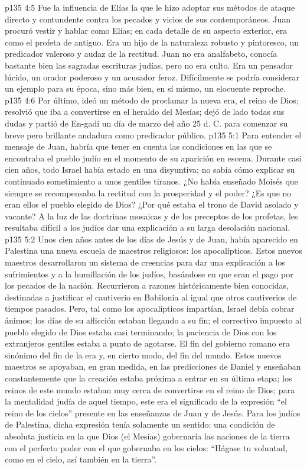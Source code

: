 \vs p135 4:5 Fue la influencia de Elías la que le hizo adoptar sus métodos de ataque directo y contundente contra los pecados y vicios de sus contemporáneos. Juan procuró vestir y hablar como Elías; en cada detalle de su aspecto exterior, era como el profeta de antiguo. Era un hijo de la naturaleza robusto y pintoresco, un predicador valeroso y audaz de la rectitud. Juan no era analfabeto, conocía bastante bien las sagradas escrituras judías, pero no era culto. Era un pensador lúcido, un orador poderoso y un acusador feroz. Difícilmente se podría considerar un ejemplo para su época, sino más bien, en sí mismo, un elocuente reproche.
\vs p135 4:6 Por último, ideó un método de proclamar la nueva era, el reino de Dios; resolvió que iba a convertirse en el heraldo del Mesías; dejó de lado todas sus dudas y partió de En\hyp{}gadi un día de marzo del año 25 d. C. para comenzar su breve pero brillante andadura como predicador público.
\vs p135 5:1 Para entender el mensaje de Juan, habría que tener en cuenta las condiciones en las que se encontraba el pueblo judío en el momento de su aparición en escena. Durante casi cien años, todo Israel había estado en una disyuntiva; no sabía cómo explicar su continuado sometimiento a unos gentiles tiranos. ¿No había enseñado Moisés que siempre se recompensaba la rectitud con la prosperidad y el poder? ¿Es que no eran ellos el pueblo elegido de Dios? ¿Por qué estaba el trono de David asolado y vacante? A la luz de las doctrinas mosaicas y de los preceptos de los profetas, les resultaba difícil a los judíos dar una explicación a su larga desolación nacional.
\vs p135 5:2 Unos cien años antes de los días de Jesús y de Juan, había aparecido en Palestina una nueva escuela de maestros religiosos: los apocalípticos. Estos nuevos maestros desarrollaron un sistema de creencias para dar una explicación a los sufrimientos y a la humillación de los judíos, basándose en que eran el pago por los pecados de la nación. Recurrieron a razones históricamente bien conocidas, destinadas a justificar el cautiverio en Babilonia al igual que otros cautiverios de tiempos pasados. Pero, tal como los apocalípticos impartían, Israel debía cobrar ánimos; los días de su aflicción estaban llegando a su fin; el correctivo impuesto al pueblo elegido de Dios estaba casi terminando; la paciencia de Dios con los extranjeros gentiles estaba a punto de agotarse. El fin del gobierno romano era sinónimo del fin de la era y, en cierto modo, del fin del mundo. Estos nuevos maestros se apoyaban, en gran medida, en las predicciones de Daniel y enseñaban constantemente que la creación estaba próxima a entrar en su última etapa; los reinos de este mundo estaban muy cerca de convertirse en el reino de Dios; para la mentalidad judía de aquel tiempo, este era el significado de la expresión “el reino de los cielos” presente en las enseñanzas de Juan y de Jesús. Para los judíos de Palestina, dicha expresión tenía solamente un sentido: una condición de absoluta justicia en la que Dios (el Mesías) gobernaría las naciones de la tierra con el perfecto poder con el que gobernaba en los cielos: “Hágase tu voluntad, como en el cielo, así también en la tierra”.
